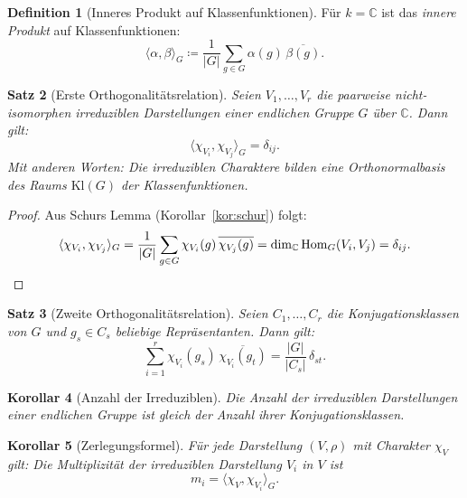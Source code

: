 \documentclass[12pt,a4paper]{amsart}
\newtheorem{theorem}{Satz}[section]
\newtheorem{korollar}[theorem]{Korollar}
\theoremstyle{definition}
\newtheorem{definition}[theorem]{Definition}
\begin{document}
\begin{definition}[Inneres Produkt auf Klassenfunktionen]
Für $k = \mathbb{C}$ ist das \emph{innere Produkt} auf Klassenfunktionen:
\[
    \langle \alpha, \beta \rangle_G \coloneqq \frac{1}{|G|} \sum_{g \in G} \alpha(g)\,\overline{\beta(g)}.
\]
\end{definition}

\begin{theorem}[Erste Orthogonalitätsrelation]
\label{satz:orth1}
Seien $V_1,\ldots,V_r$ die paarweise nicht-isomorphen irreduziblen Darstellungen
einer endlichen Gruppe $G$ über $\mathbb{C}$.  Dann gilt:
\[
    \langle \chi_{V_i}, \chi_{V_j} \rangle_G = \delta_{ij}.
\]
Mit anderen Worten: Die irreduziblen Charaktere bilden eine \emph{Orthonormalbasis}
des Raums $\mathrm{Kl}(G)$ der Klassenfunktionen.
\end{theorem}

\begin{proof}
Aus Schurs Lemma (Korollar~\ref{kor:schur}) folgt:
\[
    \langle \chi_{V_i}, \chi_{V_j} \rangle_G
    = \frac{1}{|G|} \sum_{g \in G} \chi_{V_i}(g)\,\overline{\chi_{V_j}(g)}
    = \dim_{\mathbb{C}} \mathrm{Hom}_G(V_i, V_j)
    = \delta_{ij}. \qedhere
\]
\end{proof}

\begin{theorem}[Zweite Orthogonalitätsrelation]
\label{satz:orth2}
Seien $C_1,\ldots,C_r$ die Konjugationsklassen von $G$ und $g_s \in C_s$
beliebige Repräsentanten.  Dann gilt:
\[
    \sum_{i=1}^{r} \chi_{V_i}(g_s)\,\overline{\chi_{V_i}(g_t)} = \frac{|G|}{|C_s|}\,\delta_{st}.
\]
\end{theorem}

\begin{korollar}[Anzahl der Irreduziblen]
Die Anzahl der irreduziblen Darstellungen einer endlichen Gruppe ist gleich der
Anzahl ihrer Konjugationsklassen.
\end{korollar}

\begin{korollar}[Zerlegungsformel]
\label{kor:zerlegung}
Für jede Darstellung $(V,\rho)$ mit Charakter $\chi_V$ gilt: Die Multiplizität
der irreduziblen Darstellung $V_i$ in $V$ ist
\[
    m_i = \langle \chi_V, \chi_{V_i} \rangle_G.
\]
\end{korollar}
\end{document}
